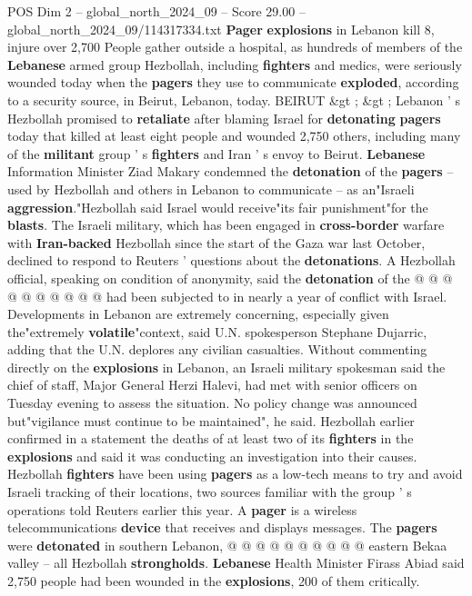 \begin{textsample}{POS Dim 2 – global\_north\_2024\_09 – Score 29.00 – global\_north\_2024\_09/114317334.txt}  \label{ex:f2_pos_130}
\textbf{Pager} \textbf{explosions} in Lebanon kill 8, injure over 2,700 People gather outside a hospital, as hundreds of members of the \textbf{Lebanese} armed group Hezbollah, including \textbf{fighters} and medics, were seriously wounded today when the \textbf{pagers} they use to communicate \textbf{exploded}, according to a security source, in Beirut, Lebanon, today.
BEIRUT \&gt ; \&gt ; Lebanon ' s Hezbollah promised to \textbf{retaliate} after blaming Israel for \textbf{detonating} \textbf{pagers} today that killed at least eight people and wounded 2,750 others, including many of the \textbf{militant} group ' s \textbf{fighters} and Iran ' s envoy to Beirut. \textbf{Lebanese} Information Minister Ziad Makary condemned the \textbf{detonation} of the \textbf{pagers} -- used by Hezbollah and others in Lebanon to communicate -- as an"Israeli \textbf{aggression}."Hezbollah said Israel would receive"its fair punishment"for the \textbf{blasts}.
The Israeli military, which has been engaged in \textbf{cross-border} warfare with \textbf{Iran-backed} Hezbollah since the start of the Gaza war last October, declined to respond to Reuters ' questions about the \textbf{detonations}.
A Hezbollah official, speaking on condition of anonymity, said the \textbf{detonation} of the @ @ @ @ @ @ @ @ @ @ had been subjected to in nearly a year of conflict with Israel.
Developments in Lebanon are extremely concerning, especially given the"extremely \textbf{volatile}"context, said U.N. spokesperson Stephane Dujarric, adding that the U.N. deplores any civilian casualties.
Without commenting directly on the \textbf{explosions} in Lebanon, an Israeli military spokesman said the chief of staff, Major General Herzi Halevi, had met with senior officers on Tuesday evening to assess the situation.
No policy change was announced but"vigilance must continue to be maintained", he said.
Hezbollah earlier confirmed in a statement the deaths of at least two of its \textbf{fighters} in the \textbf{explosions} and said it was conducting an investigation into their causes.
Hezbollah \textbf{fighters} have been using \textbf{pagers} as a low-tech means to try and avoid Israeli tracking of their locations, two sources familiar with the group ' s operations told Reuters earlier this year.
A \textbf{pager} is a wireless telecommunications \textbf{device} that receives and displays messages.
The \textbf{pagers} were \textbf{detonated} in southern Lebanon, @ @ @ @ @ @ @ @ @ @ eastern Bekaa valley -- all Hezbollah \textbf{strongholds}. \textbf{Lebanese} Health Minister Firass Abiad said 2,750 people had been wounded in the \textbf{explosions}, 200 of them critically.

\end{textsample}
